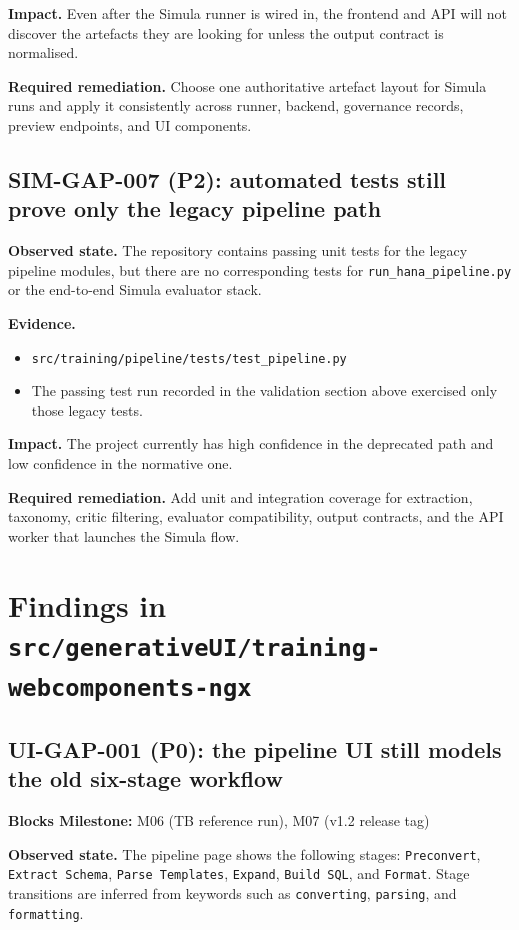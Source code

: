 \documentclass[12pt,a4paper,twoside]{report}
\begin{document}
\textbf{Impact.}
Even after the Simula runner is wired in, the frontend and API will
not discover the artefacts they are looking for unless the output
contract is normalised.

\textbf{Required remediation.}
Choose one authoritative artefact layout for Simula runs and apply it
consistently across runner, backend, governance records, preview
endpoints, and UI components.

\subsection*{SIM-GAP-007 (P2): automated tests still prove only the legacy pipeline path}
\textbf{Observed state.}
The repository contains passing unit tests for the legacy pipeline
modules, but there are no corresponding tests for
\texttt{run\_hana\_pipeline.py} or the end-to-end Simula evaluator
stack.

\textbf{Evidence.}
\begin{itemize}
\item \texttt{src/training/pipeline/tests/test\_pipeline.py}
\item The passing test run recorded in the validation section above
exercised only those legacy tests.
\end{itemize}

\textbf{Impact.}
The project currently has high confidence in the deprecated path and
low confidence in the normative one.

\textbf{Required remediation.}
Add unit and integration coverage for extraction, taxonomy, critic
filtering, evaluator compatibility, output contracts, and the API
worker that launches the Simula flow.

\section{Findings in \texttt{src/generativeUI/training-webcomponents-ngx}}

\subsection*{UI-GAP-001 (P0): the pipeline UI still models the old six-stage workflow}
\label{gap:ui-001}
\textbf{Blocks Milestone:} M06 (TB reference run), M07 (v1.2 release tag)

\textbf{Observed state.}
The pipeline page shows the following stages:
\texttt{Preconvert}, \texttt{Extract Schema}, \texttt{Parse
Templates}, \texttt{Expand}, \texttt{Build SQL}, and
\texttt{Format}. Stage transitions are inferred from keywords such as
\texttt{converting}, \texttt{parsing}, and \texttt{formatting}.
\end{document}

